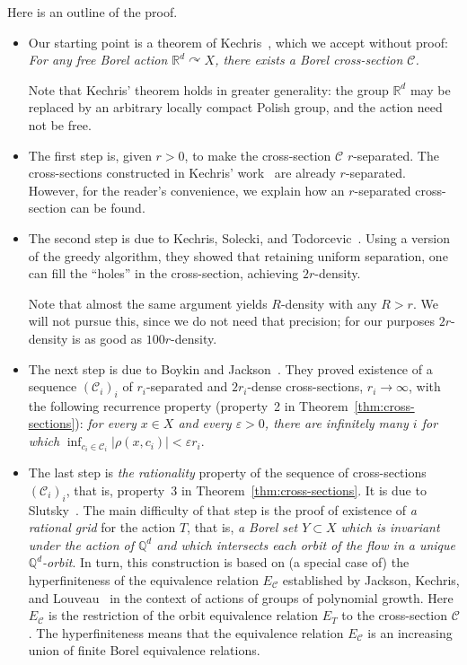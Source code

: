 \documentclass[11pt]{paper}
\newcommand{\bR}{\mathbb R}
\newcommand{\bQ}{\mathbb Q}
\newcommand{\cC}{\mathcal C}
\newcommand{\eps}{\varepsilon}
\begin{document}
Here is an outline of the proof.
\begin{itemize}
\item
Our starting point is a theorem of Kechris~\cite{Kechris1992, Kechris-Lectures},
which we accept without proof:
{\em For any free Borel action $\bR^d \curvearrowright X$,
there exists a Borel cross-section $\cC$.}

Note that Kechris' theorem holds in greater generality: the group $\bR^d$ may be replaced by an
arbitrary locally compact Polish group, and the action need not be free.

\item The first step is, given $r>0$, to make the cross-section $\cC$ $r$-separated.  The
  cross-sections constructed in Kechris' work~\cite{Kechris1992} are already
  \(r\)-separated. However, for the reader's convenience, we explain how an \(r\)-separated
  cross-section can be found.

\item
The second step is due to Kechris, Solecki, and Todorcevic~\cite{KST}.
Using a version of the greedy algorithm, they showed that retaining uniform
separation, one can fill the ``holes'' in the cross-section, achieving $2r$-density.

Note that almost the same argument yields $R$-density with any $R>r$.  We will not pursue this,
since we do not need that precision; for our purposes $2r$-density is as good as $100r$-density.


\item
The next step is due to Boykin and Jackson~\cite{BJ}.
They proved existence of a sequence $(\cC_i)_i$ of $r_i$-separated and $2r_i$-dense
cross-sections, $r_i\to\infty$, with the following recurrence property (property~2 in Theorem~\ref{thm:cross-sections}): {\em for every $x\in X$ and
every $\eps>0$, there are infinitely many $i$ for which}
$\displaystyle \inf_{c_i\in\cC_i} |\rho(x, c_i)| < \eps r_i$.


\item The last step is {\em the rationality} property of the sequence of cross-sections $(\cC_i)_i$,
  that is, property~3 in Theorem~\ref{thm:cross-sections}. It is due to
  Slutsky~\cite[Lemma~2.3]{Slutsky2017}.  The main difficulty of that step is the proof of existence
  of {\em a rational grid} for the action $T$, that is, {\em a Borel set $Y\subset X$ which is
    invariant under the action of $\bQ^d$ and which intersects each orbit of the flow in a unique
    $\bQ^d$-orbit}. In turn, this construction is based on (a special case of) the hyperfiniteness
  of the equivalence relation $E_{\cC}$ established by Jackson, Kechris, and Louveau~\cite{JKL} in the context
  of actions of groups of polynomial growth. Here $E_\cC$ is the restriction of the orbit
  equivalence relation $E_T$ to the cross-section $\cC$. The hyperfiniteness means that the
  equivalence relation $E_\cC$ is an increasing union of finite Borel equivalence relations.
\end{itemize}
\end{document}
